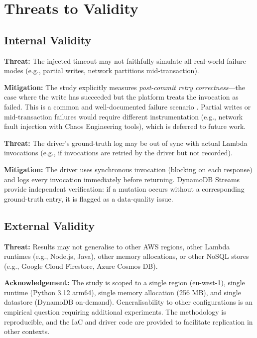 \section{Threats to Validity}

\subsection{Internal Validity}

\textbf{Threat:} The injected timeout may not faithfully simulate all real-world failure modes (e.g., partial writes, network partitions mid-transaction).

\textbf{Mitigation:} The study explicitly measures \textit{post-commit retry correctness}---the case where the write has succeeded but the platform treats the invocation as failed. This is a common and well-documented failure scenario \citep{AWSLambdaDocs}. Partial writes or mid-transaction failures would require different instrumentation (e.g., network fault injection with Chaos Engineering tools), which is deferred to future work.

\textbf{Threat:} The driver's ground-truth log may be out of sync with actual Lambda invocations (e.g., if invocations are retried by the driver but not recorded).

\textbf{Mitigation:} The driver uses synchronous invocation (blocking on each response) and logs every invocation immediately before returning. DynamoDB Streams provide independent verification: if a mutation occurs without a corresponding ground-truth entry, it is flagged as a data-quality issue.

\subsection{External Validity}

\textbf{Threat:} Results may not generalise to other AWS regions, other Lambda runtimes (e.g., Node.js, Java), other memory allocations, or other NoSQL stores (e.g., Google Cloud Firestore, Azure Cosmos DB).

\textbf{Acknowledgement:} The study is scoped to a single region (eu-west-1), single runtime (Python 3.12 arm64), single memory allocation (256 MB), and single datastore (DynamoDB on-demand). Generalisability to other configurations is an empirical question requiring additional experiments. The methodology is reproducible, and the IaC and driver code are provided to facilitate replication in other contexts.

